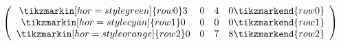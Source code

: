 
\begin{equation}\label{fig:csr_example}
  \left(\begin{array}{cccc}
    \tikzmarkin[hor=style green]{row0}  3 & 0 & 4 & 0 \tikzmarkend{row0} \\
    \tikzmarkin[hor=style cyan]{row1}   0 & 0 & 0 & 0 \tikzmarkend{row1} \\
    \tikzmarkin[hor=style orange]{row2} 0 & 0 & 7 & 8 \tikzmarkend{row2} \\
  \end{array}\right)
\end{equation}
